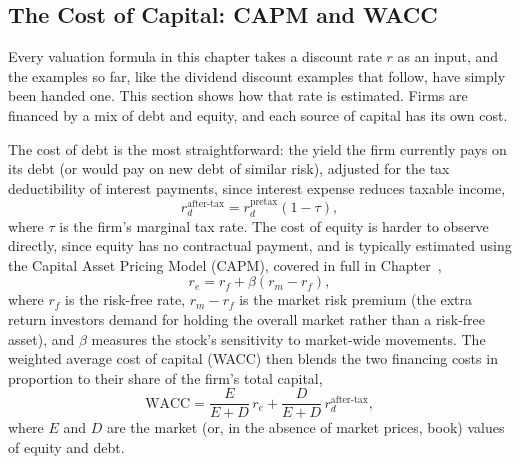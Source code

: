 \documentclass[../ai_in_finance]{subfiles}
\begin{document}
\subsection{The Cost of Capital: CAPM and WACC}
\label{sec:wacc}

Every valuation formula in this chapter takes a discount rate $r$ as an input, and the examples so far, like the dividend discount examples that follow, have simply been handed one. This section shows how that rate is estimated. Firms are financed by a mix of debt and equity, and each source of capital has its own cost.

The cost of debt is the most straightforward: the yield the firm currently pays on its debt (or would pay on new debt of similar risk), adjusted for the tax deductibility of interest payments, since interest expense reduces taxable income,
\begin{equation*}
r_d^{\text{after-tax}} = r_d^{\text{pretax}} (1 - \tau),
\end{equation*}
where $\tau$ is the firm's marginal tax rate. The cost of equity is harder to observe directly, since equity has no contractual payment, and is typically estimated using the Capital Asset Pricing Model (CAPM), covered in full in Chapter~,
\begin{equation}
r_e = r_f + \beta (r_m - r_f),\label{eq:valuation-capm}
\end{equation}
where $r_f$ is the risk-free rate, $r_m - r_f$ is the market risk premium (the extra return investors demand for holding the overall market rather than a risk-free asset), and $\beta$ measures the stock's sensitivity to market-wide movements. The weighted average cost of capital (WACC) then blends the two financing costs in proportion to their share of the firm's total capital,
\begin{equation}
\text{WACC} = \frac{E}{E+D}\, r_e + \frac{D}{E+D}\, r_d^{\text{after-tax}},\label{eq:valuation-wacc}
\end{equation}
where $E$ and $D$ are the market (or, in the absence of market prices, book) values of equity and debt.
\end{document}
